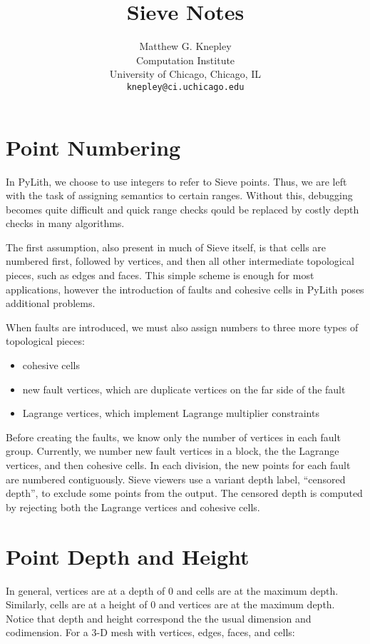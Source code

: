 \documentclass[12pt]{article}
\title{Sieve Notes}
\author{Matthew G. Knepley\\
\small Computation Institute\\[-0.8ex]
\small University of Chicago, Chicago, IL\\
\small \texttt{knepley@ci.uchicago.edu}\\
}
\begin{document}
\maketitle

\section{Point Numbering}

    In PyLith, we choose to use integers to refer to Sieve points. Thus, we are left with the task of assigning
semantics to certain ranges. Without this, debugging becomes quite difficult and quick range checks qould be replaced by
costly depth checks in many algorithms.

    The first assumption, also present in much of Sieve itself, is that cells are numbered first, followed by vertices,
and then all other intermediate topological pieces, such as edges and faces. This simple scheme is enough for most
applications, however the introduction of faults and cohesive cells in PyLith poses additional problems.

    When faults are introduced, we must also assign numbers to three more types of topological pieces:
\begin{itemize}
  \item cohesive cells

  \item new fault vertices, which are duplicate vertices on the far side of the fault

  \item Lagrange vertices, which implement Lagrange multiplier constraints
\end{itemize}
Before creating the faults, we know only the number of vertices in each fault group. Currently, we number new fault
vertices in a block, the the Lagrange vertices, and then cohesive cells. In each division, the new points for each fault
are numbered contiguously. Sieve viewers use a variant depth label, ``censored depth'', to exclude some points from the
output. The censored depth is computed by rejecting both the Lagrange vertices and cohesive cells.

\section{Point Depth and Height}

    In general, vertices are at a depth of 0 and cells are at the maximum depth. Similarly, cells are at a height of 0
and vertices are at the maximum depth. Notice that depth and height correspond the the usual dimension and
codimension. For a 3-D mesh with vertices, edges, faces, and cells:
\end{document}
